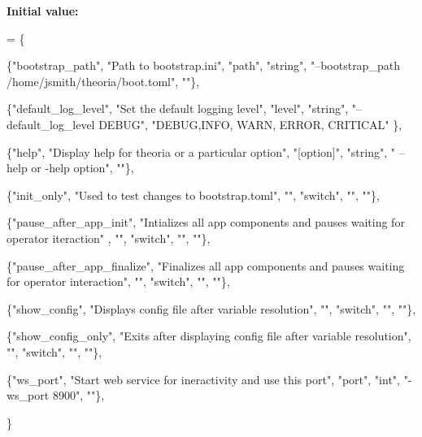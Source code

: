 {\bfseries Initial value\+:}
\begin{DoxyCode}
= \{

        \{\textcolor{stringliteral}{"bootstrap\_path"},    \textcolor{stringliteral}{"Path to bootstrap.ini"}, \textcolor{stringliteral}{"path"}, \textcolor{stringliteral}{"string"}, \textcolor{stringliteral}{"--bootstrap\_path
       /home/jsmith/theoria/boot.toml"}, \textcolor{stringliteral}{""}\}, 

        \{\textcolor{stringliteral}{"default\_log\_level"}, \textcolor{stringliteral}{"Set the default logging level"}, \textcolor{stringliteral}{"level"}, \textcolor{stringliteral}{"string"}, \textcolor{stringliteral}{"--default\_log\_level
       DEBUG"}, \textcolor{stringliteral}{"DEBUG,INFO, WARN, ERROR, CRITICAL"} \}, 

        \{\textcolor{stringliteral}{"help"},              \textcolor{stringliteral}{"Display help for theoria or a particular option"}, \textcolor{stringliteral}{"[option]"},  \textcolor{stringliteral}{"string"}, \textcolor{stringliteral}{"
      --help or -help option"}, \textcolor{stringliteral}{""}\}, 

        \{\textcolor{stringliteral}{"init\_only"},         \textcolor{stringliteral}{"Used to test changes to bootstrap.toml"}, \textcolor{stringliteral}{""}, \textcolor{stringliteral}{"switch"}, \textcolor{stringliteral}{""}, \textcolor{stringliteral}{""}\},

        \{\textcolor{stringliteral}{"pause\_after\_app\_init"}, \textcolor{stringliteral}{"Intializes all app components and pauses waiting for operator iteraction"}
      , \textcolor{stringliteral}{""}, \textcolor{stringliteral}{"switch"}, \textcolor{stringliteral}{""}, \textcolor{stringliteral}{""}\}, 

        \{\textcolor{stringliteral}{"pause\_after\_app\_finalize"}, \textcolor{stringliteral}{"Finalizes all app components and pauses waiting for operator
       interaction"}, \textcolor{stringliteral}{""}, \textcolor{stringliteral}{"switch"}, \textcolor{stringliteral}{""}, \textcolor{stringliteral}{""}\}, 

        \{\textcolor{stringliteral}{"show\_config"}, \textcolor{stringliteral}{"Displays config file after variable resolution"}, \textcolor{stringliteral}{""}, \textcolor{stringliteral}{"switch"}, \textcolor{stringliteral}{""}, \textcolor{stringliteral}{""}\}, 

        \{\textcolor{stringliteral}{"show\_config\_only"}, \textcolor{stringliteral}{"Exits after displaying config file after variable resolution"}, \textcolor{stringliteral}{""}, \textcolor{stringliteral}{"switch"}, \textcolor{stringliteral}{
      ""}, \textcolor{stringliteral}{""}\}, 

        \{\textcolor{stringliteral}{"ws\_port"}, \textcolor{stringliteral}{"Start web service for ineractivity and use this port"}, \textcolor{stringliteral}{"port"}, \textcolor{stringliteral}{"int"}, \textcolor{stringliteral}{"-ws\_port 8900"},
       \textcolor{stringliteral}{""}\},  

        \}
\end{DoxyCode}
